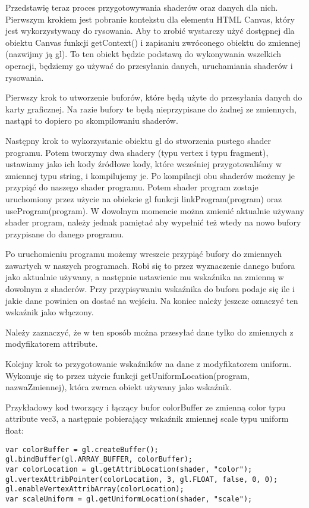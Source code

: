 Przedstawię teraz proces przygotowywania shaderów oraz danych dla nich. Pierwszym krokiem jest pobranie kontekstu dla elementu HTML Canvas, który jest wykorzystywany do rysowania. Aby to zrobić wystarczy użyć dostępnej dla obiektu Canvas funkcji getContext() i zapisaniu zwróconego obiektu do zmiennej (nazwijmy ją gl). To ten obiekt będzie podstawą do wykonywania wszelkich operacji, będziemy go używać do przesyłania danych, uruchamiania shaderów i rysowania.

Pierwszy krok to utworzenie buforów, które będą użyte do przesyłania danych do karty graficznej. Na razie bufory te będą nieprzypisane do żadnej ze zmiennych, nastąpi to dopiero po skompilowaniu shaderów.

Następny krok to wykorzystanie obiektu gl do stworzenia pustego shader programu. Potem tworzymy dwa shadery (typu vertex i typu fragment), ustawiamy jako ich kody źródłowe kody, które wcze\'sniej przygotowali\'smy w zmiennej typu string, i kompilujemy je. Po kompilacji obu shaderów możemy je przypiąć do naszego shader programu. Potem shader program zostaje uruchomiony przez użycie na obiekcie gl funkcji linkProgram(program) oraz useProgram(program). W dowolnym momencie można zmienić aktualnie używany shader program, należy jednak pamiętać aby wypełnić też wtedy na nowo bufory przypisane do danego programu.

Po uruchomieniu programu możemy wreszcie przypiąć bufory do zmiennych zawartych w naszych programach. Robi się to przez wyznaczenie danego bufora jako aktualnie używany, a następnie ustawienie mu wskaźnika na zmienną w dowolnym z shaderów. Przy przypisywaniu wskaźnika do bufora podaje się ile i jakie dane powinien on dostać na wej\'sciu. Na koniec należy jeszcze oznaczyć ten wskaźnik jako włączony.

Należy zaznaczyć, że w ten sposób można przesyłać dane tylko do zmiennych z modyfikatorem attribute.

Kolejny krok to przygotowanie wskaźników na dane z modyfikatorem uniform. Wykonuje się to przez użycie funkcji getUniformLocation(program, nazwaZmiennej), która zwraca obiekt używany jako wskaźnik.

\noindent Przykładowy kod tworzący i łączący bufor colorBuffer ze zmienną color typu attribute vec3, a następnie pobierający wskaźnik zmiennej scale typu uniform float:
\begin{lstlisting}
var colorBuffer = gl.createBuffer();
gl.bindBuffer(gl.ARRAY_BUFFER, colorBuffer);
var colorLocation = gl.getAttribLocation(shader, "color");
gl.vertexAttribPointer(colorLocation, 3, gl.FLOAT, false, 0, 0);
gl.enableVertexAttribArray(colorLocation);
var scaleUniform = gl.getUniformLocation(shader, "scale");
\end{lstlisting}

